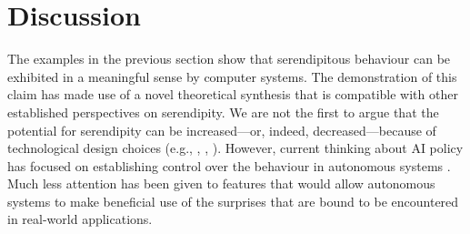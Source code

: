 \section{Discussion} \label{sec:discussion}





The examples in the previous section show that serendipitous behaviour
can be exhibited in a meaningful sense by computer systems.
The demonstration of this claim has made use of a novel theoretical
synthesis that is compatible with other established perspectives on
serendipity.  We are not the first to argue that the potential for
serendipity can be increased---or, indeed, decreased---because of
technological design choices (e.g., \cite{danzico2010design},
\cite{newman2002designing}, \cite{melo2018}).
However, current thinking about AI policy has focused on establishing
control over the behaviour in autonomous systems
\cite{research-priorities}.  Much less attention has been given to
features that would allow autonomous systems to make beneficial use of
the surprises that are bound to be encountered in real-world
applications.

